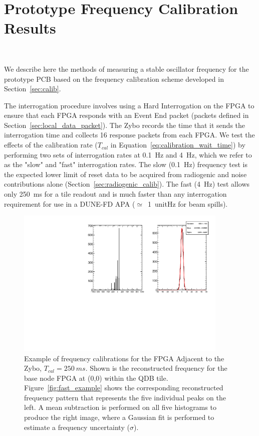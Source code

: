 \section{Prototype Frequency Calibration Results}~\label{sec:freq_calib_results}

We describe here the methods of measuring a stable oscillator frequency for the prototype PCB based on the frequency calibration scheme developed in Section~\ref{sec:calib}.

The interrogation procedure involves using a Hard Interrogation on the FPGA to ensure that each FPGA responds with an Event End packet (packets defined in Section~\ref{sec:local_data_packet}).
The Zybo records the time that it sends the interrogation time and collects 16 response packets from each FPGA.
We test the effects of the calibration rate ($T_{cal}$ in Equation~\ref{eq:calibration_wait_time}) by performing two sets of interrogation rates at 0.1~\unit{Hz} and 4~\unit{Hz}, which we refer to as the "slow" and "fast" interrogation rates.
The slow (0.1~\unit{Hz}) frequency test is the expected lower limit of reset data to be acquired from radiogenic and noise contributions alone (Section~\ref{sec:radiogenic_calib}).
The fast (4~\unit{Hz}) test allows only 250~\unit{ms} for a tile readout and is much faster than any interrogation requirement for use in a DUNE-FD APA ($\simeq$~1~unit{Hz} for beam spills). 

\begin{figure}[]
\centering
\includegraphics[width=0.9\textwidth]{images/(0,0).pdf}
\caption{Example of frequency calibrations for the FPGA Adjacent to the Zybo, $T_{cal} = 250~\unit{ms}$.
Shown is the reconstructed frequency for the base node FPGA at (0,0) within the QDB tile.
Figure~\ref{fig:fast_example} shows the corresponding reconstructed frequency pattern that represents the five individual peaks on the left.
A mean subtraction is performed on all five histograms to produce the right image, where a Gaussian fit is performed to estimate a frequency uncertainty ($\sigma$).
}
\label{fig:frq_recon_node00}
\end{figure}

